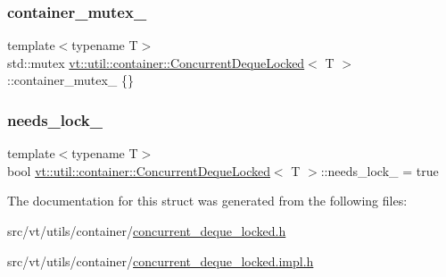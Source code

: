 \mbox{\label{structvt_1_1util_1_1container_1_1_concurrent_deque_locked_a8e3bf213b7580d8d7c9f9bc926ac21b4}} 
\subsubsection{\texorpdfstring{container\+\_\+mutex\+\_\+}{container\_mutex\_}}
{\footnotesize\ttfamily template$<$typename T$>$ \\
std\+::mutex \hyperlink{structvt_1_1util_1_1container_1_1_concurrent_deque_locked}{vt\+::util\+::container\+::\+Concurrent\+Deque\+Locked}$<$ T $>$\+::container\+\_\+mutex\+\_\+ \{\}\hspace{0.3cm}{\ttfamily [private]}}

\mbox{\label{structvt_1_1util_1_1container_1_1_concurrent_deque_locked_af681c689f7800fca7e35364aeffd9964}} 
\subsubsection{\texorpdfstring{needs\+\_\+lock\+\_\+}{needs\_lock\_}}
{\footnotesize\ttfamily template$<$typename T$>$ \\
bool \hyperlink{structvt_1_1util_1_1container_1_1_concurrent_deque_locked}{vt\+::util\+::container\+::\+Concurrent\+Deque\+Locked}$<$ T $>$\+::needs\+\_\+lock\+\_\+ = true\hspace{0.3cm}{\ttfamily [private]}}



The documentation for this struct was generated from the following files\+:\begin{DoxyCompactItemize}
\item 
src/vt/utils/container/\hyperlink{concurrent__deque__locked_8h}{concurrent\+\_\+deque\+\_\+locked.\+h}\item 
src/vt/utils/container/\hyperlink{concurrent__deque__locked_8impl_8h}{concurrent\+\_\+deque\+\_\+locked.\+impl.\+h}\end{DoxyCompactItemize}
